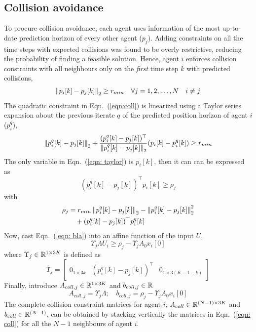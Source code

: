 \subsection{Collision avoidance}
To procure collision avoidance, each agent uses information of the most up-to-date prediction horizon of every other agent ($p_j$). Adding constraints on all the time steps with expected collisions was found to be overly restrictive, reducing the probability of finding a feasible solution. Hence, agent $i$ enforces collision constraints with all neighbours only on the \textit{first} time step $k$ with predicted collisions,
\begin{equation}
\label{eqn:coll}
\left\Vert p_i[k]-p_j[k]\right\Vert_2 \geq r_{min} \quad \forall j = 1,2,\ldots,N \quad i \neq j
\end{equation}	
The quadratic constraint in Eqn.~(\ref{eqn:coll}) is linearized using a Taylor series expansion about the previous iterate $q$ of the predicted position horizon of agent $i$ ($p_i^q$),
\begin{equation}
\label{eqn: taylor}
\left\Vert p^q_i[k] - p_j[k]\right\Vert_2 + \frac{(p_i^q[k]-p_j[k])^\top}{\left\Vert p^q_i[k] - p_j[k]\right\Vert_2}(p_i[k]-p_i^q[k]) \geq r_{min}
\end{equation}
The only variable in Eqn.~(\ref{eqn: taylor}) is $p_i[k]$, then it can can be expressed as
\begin{equation}
\label{eqn: bla}
(p_i^q[k]-p_j[k])^\top p_i[k] \geq \rho_j
\end{equation}
with
\begin{equation}
\begin{aligned}
\rho_j &= r_{min}\left\Vert p^q_i[k] - p_j[k]\right\Vert_2 - \left\Vert p^q_i[k] - p_j[k]\right\Vert_2^2 \\
& \hspace{1em}+ (p_i^q[k]-p_j[k])^\top p^q_i[k]
\end{aligned}
\end{equation}
Now, cast Eqn.~(\ref{eqn: bla}) into an affine function of the input $U$,
\begin{equation}
\Upsilon_j \Lambda U_i \geq \rho_j - \Upsilon_j A_0 x_i[0]
\end{equation}
where $\Upsilon_j \in {\mathbb R}^{1 \times 3K}$ is defined as
\begin{equation}
\Upsilon_j = \begin{bmatrix}
0_{1\times 3k} & (p_i^q[k]-p_j[k])^\top & 0_{1 \times 3(K-1-k)}
\end{bmatrix}
\end{equation}
Finally, introduce $A_{coll,j} \in {\mathbb R}^{1 \times 3K}$ and $b_{coll,j} \in {\mathbb R}$
\begin{equation}
\label{eqn: coll}
A_{coll,j} = \Upsilon_j \Lambda ; \quad b_{coll,j} = \rho_j - \Upsilon_j A_0 x_i[0]
\end{equation}
The complete collision constraint matrices for agent $i$, $A_{coll} \in {\mathbb R}^{(N-1) \times 3K}$ and $b_{coll} \in {\mathbb R}^{(N-1)}$, can be obtained by stacking vertically the matrices in Eqn.~(\ref{eqn: coll}) for all the $N-1$ neighbours of agent $i$.


